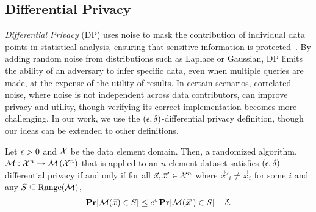 \subsection{Differential Privacy}
\emph{Differential Privacy} (DP) uses noise to mask the contribution of individual data points in statistical analysis, ensuring that sensitive information is protected~\cite{dwork2006differential}. 
By adding random noise from distributions such as Laplace or Gaussian, DP limits the ability of an adversary to infer specific data, even when multiple queries are made, at the expense of the utility of results. 
In certain scenarios, correlated noise, where noise is not independent across data contributors, can improve privacy and utility, though verifying its correct implementation becomes more challenging.
In our work, we use the $(\epsilon, \delta)$-differential privacy definition, though our ideas can be extended to other definitions.

\begin{definition}
	Let $\epsilon > 0$ and $\mathcal{X}$ be the data element domain.
	Then, a randomized algorithm, $\mathcal{M} : \mathcal{X}^n \rightarrow \mathcal{M}\left(\mathcal{X}^n\right)$ that is applied to an $n$-element dataset satisfies $(\epsilon, \delta)$-differential privacy if and only if for all $\vec{x},\vec{x}' \in \mathcal{X}^n$ where $\vec{x}'_i \neq \vec{x}_i$ for some $i$ and any $S \subseteq \text{Range}(\mathcal{M})$,
	\[
		\operatorname*{\mathbf{Pr}}[\mathcal{M}(\vec{x}) \in S] \leq e^\epsilon \operatorname*{\mathbf{Pr}}[\mathcal{M}(\vec{x}') \in S] + \delta.
	\]
\end{definition}


